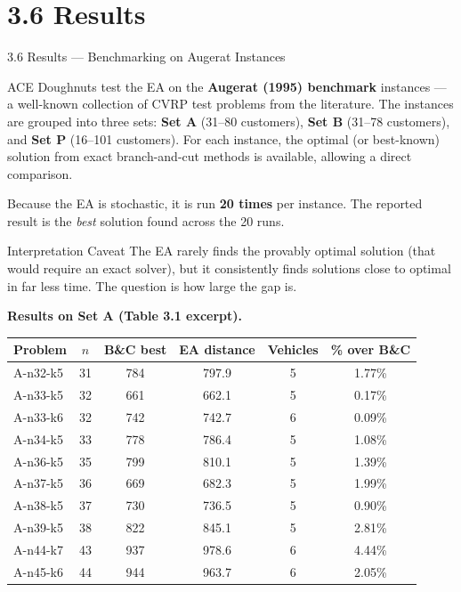 \documentclass[aspectratio=169,10pt]{beamer}
\begin{document}
\section{3.6 Results}

\begin{frame}[allowframebreaks]{3.6 Results — Benchmarking on Augerat Instances}

  ACE Doughnuts test the EA on the \textbf{Augerat (1995) benchmark} instances —
  a well-known collection of CVRP test problems from the literature.
  The instances are grouped into three sets:
  \textbf{Set A} (31--80 customers),
  \textbf{Set B} (31--78 customers),
  and \textbf{Set P} (16--101 customers).
  For each instance, the optimal (or best-known) solution from exact branch-and-cut methods
  is available, allowing a direct comparison.

  \medskip
  Because the EA is stochastic, it is run \textbf{20 times} per instance.
  The reported result is the \emph{best} solution found across the 20 runs.

  \begin{alertblock}{Interpretation Caveat}
    The EA rarely finds the provably optimal solution (that would require an exact solver),
    but it consistently finds solutions close to optimal in far less time.
    The question is how large the gap is.
  \end{alertblock}

  \framebreak

  \textbf{Results on Set A (Table 3.1 excerpt).}

  \begin{center}
    \small
    \begin{tabular}{lccccc}
      \toprule
      Problem & $n$ & B\&C best & EA distance & Vehicles & \% over B\&C \\
      \midrule
      A-n32-k5  & 31 & 784  & 797.9  & 5 & 1.77\% \\
      A-n33-k5  & 32 & 661  & 662.1  & 5 & 0.17\% \\
      A-n33-k6  & 32 & 742  & 742.7  & 6 & 0.09\% \\
      A-n34-k5  & 33 & 778  & 786.4  & 5 & 1.08\% \\
      A-n36-k5  & 35 & 799  & 810.1  & 5 & 1.39\% \\
      A-n37-k5  & 36 & 669  & 682.3  & 5 & 1.99\% \\
      A-n38-k5  & 37 & 730  & 736.5  & 5 & 0.90\% \\
      A-n39-k5  & 38 & 822  & 845.1  & 5 & 2.81\% \\
      A-n44-k7  & 43 & 937  & 978.6  & 6 & 4.44\% \\
      A-n45-k6  & 44 & 944  & 963.7  & 6 & 2.05\% \\
      \bottomrule
    \end{tabular}
  \end{center}


\end{frame}
\end{document}

